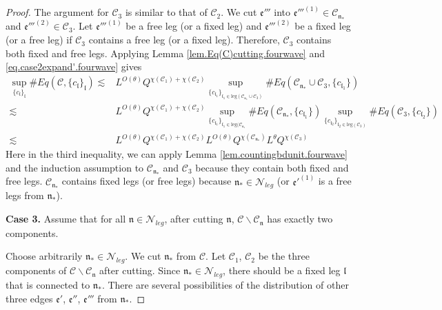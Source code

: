 \begin{proof}
    The argument for $\mathcal{C}_3$ is similar to that of $\mathcal{C}_2$. We cut $\mathfrak{e}'''$ into $\mathfrak{e}'''^{(1)}\in \mathcal{C}_{\mathfrak{n}_*}$ and $\mathfrak{e}'''^{(2)}\in \mathcal{C}_3$. Let $\mathfrak{e}'''^{(1)}$ be a free leg (or a fixed leg) and $\mathfrak{e}'''^{(2)}$ be a fixed leg (or a free leg) if $\mathcal{C}_3$ contains a free leg (or a fixed leg). Therefore, $\mathcal{C}_3$ contains both fixed and free legs. Applying Lemma \ref{lem.Eq(C)cutting.fourwave} and \eqref{eq.case2expand'.fourwave} gives
    \begin{equation}
    \begin{split}
     \sup_{\{c_{\mathfrak{l}}\}_{\mathfrak{l}}}\#Eq(\mathcal{C},\{c_{\mathfrak{l}}\}_{\mathfrak{l}})
     \lesssim& L^{O(\theta)} Q^{\chi(\mathcal{C}_1)+\chi(\mathcal{C}_2)}\sup_{\{c_{\mathfrak{l}_1}\}_{\mathfrak{l}_1\in \text{leg}(\mathcal{C}_{\mathfrak{n}_*}\cup \mathcal{C}_3)} } \# Eq(\mathcal{C}_{\mathfrak{n}_*}\cup \mathcal{C}_3,\{c_{\mathfrak{l}_1}\}) 
     \\
     \lesssim& L^{O(\theta)} Q^{\chi(\mathcal{C}_1)+\chi(\mathcal{C}_2)}\sup_{\{c_{\mathfrak{l}_1}\}_{\mathfrak{l}_1\in \text{leg}(\mathcal{C}_{\mathfrak{n}_*}} } \# Eq(\mathcal{C}_{\mathfrak{n}_*},\{c_{\mathfrak{l}_1}\}) \sup_{\{c_{\mathfrak{l}_2}\}_{\mathfrak{l}_2\in \text{leg}(\mathcal{C}_3)} }\# Eq(\mathcal{C}_{3}, \{c_{\mathfrak{l}_2}\})
     \\
     \lesssim& L^{O(\theta)} Q^{\chi(\mathcal{C}_1)+\chi(\mathcal{C}_2)} L^{O(\theta)} Q^{\chi(\mathcal{C}_{\mathfrak{n}_*})} L^\theta Q^{\chi(\mathcal{C}_3)} 
    \end{split}
    \end{equation}
    Here in the third inequality, we can apply Lemma \ref{lem.countingbdunit.fourwave} and the induction assumption to $\mathcal{C}_{\mathfrak{n}_*}$ and $\mathcal{C}_3$ because they contain both fixed and free legs. $\mathcal{C}_{\mathfrak{n}_*}$ contains fixed legs (or free legs) because $\mathfrak{n}_*\in\mathcal{N}_{leg}$ (or $\mathfrak{e}'^{(1)}$ is a free legs from $\mathfrak{n}_*$).
    
    \textbf{Case 3.} Assume that for all $\mathfrak{n}\in \mathcal{N}_{leg}$, after cutting $\mathfrak{n}$, $\mathcal{C}\backslash \mathcal{C}_{\mathfrak{n}}$ has exactly two components.
    
    Choose arbitrarily $\mathfrak{n}_*\in \mathcal{N}_{leg}$. We cut $\mathfrak{n}_*$ from $\mathcal{C}$. Let $\mathcal{C}_1$, $\mathcal{C}_2$ be the three components of $\mathcal{C}\backslash \mathcal{C}_{\mathfrak{n}}$ after cutting. Since $\mathfrak{n}_*\in \mathcal{N}_{leg}$, there should be a fixed leg $\mathfrak{l}$ that is connected to $\mathfrak{n}_*$. There are several possibilities of the distribution of other three edges $\mathfrak{e}'$, $\mathfrak{e}''$, $\mathfrak{e}'''$ from $\mathfrak{n}_*$. 
    

\end{proof}
